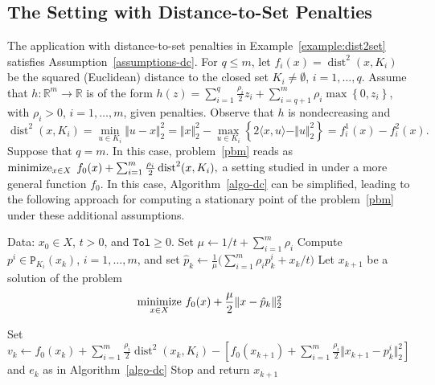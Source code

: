 \documentclass[smallextended,envcountsect]{svjour3}
\newcommand{\norm}[1]{\textstyle{\Vert} #1 \textstyle{\Vert}_2}
\newcommand{\col}[1]{\left\{#1\right\}}
\newcommand{\tol}{\texttt{Tol}}
\newcommand{\inner}[2]{\langle#1,#2\rangle}
\newcommand{\fc}[2]{: #1 \rightarrow #2}
\renewcommand{\Re}{\mathbb{R}}
\newcommand{\proj}{\mathtt{P}}
\DeclareMathOperator{\dist}{dist}
\newcommand{\nnmin}{\mathop{\rm minimize}}
\begin{document}
\subsection{The Setting with Distance-to-Set Penalties}
The application with distance-to-set penalties in Example~\ref{example:dist2set} satisfies Assumption~\ref{assumptions-dc}. For $q\leq  m$, let $f_i(x)=\dist^2(x,K_i)$ be the
 squared (Euclidean) distance to the closed  set $K_i\neq \emptyset$, $i=1,\ldots,q$. 
 Assume that 
 $h\fc{\Re^m}{\Re}$ is of the form  $h(z) = \sum_{i=1}^q\frac{\rho_i}{2} z_i +  \sum_{i=q+1}^m \rho_i\max\col{0,z_i} $, with  $\rho_i>0$, $i=1,\ldots,m$, given penalties.
Observe that $h$ is nondecreasing and
\begin{equation}\label{eq:dist2set-dc}
\dist^2(x,K_i)=\min_{u \in K_i} \norm{u-x}^2 = \norm{x}^2-\displaystyle\max_{u \in K_i} \col{2\inner{x}{u} - \norm{u}^2}=f_i^1(x)-f_i^2(x).
\end{equation}
Suppose that $q=m$. In this case, problem~\eqref{pbm} reads as
$
\nnmin_{x \in X} \; f_0 (x) + \sum_{i=1}^m \frac{\rho_i}{2} \dist^2(x,K_i),
$
a setting studied in \cite{vanAckooij_Oliveira_2025} under a more general function $f_0$. 
%
In this case, Algorithm~\ref{algo-dc} can be simplified, leading to the following approach for computing a stationary point of the problem~\eqref{pbm} under these additional assumptions.
\begin{algorithm}[htb]
\caption{Proximal Distance Algorithm - a variant of Algorithm~\ref{algo-dc}}
\label{algo-dist2set}
\begin{algorithmic}[1]
{\footnotesize
\State Data: $x_0 \in X$, $t>0$,  and $\tol\geq 0$. Set $\mu\gets 1/t+\sum_{i=1}^m\rho_i$
 \State Compute $ p^i \in \proj_{K_i}(x_k)$, $i=1,\ldots,m$, and set $\hat p_k\gets \frac{1}{\mu}\Big(\sum_{i=1}^m\rho_i p^i_{k}+x_k/t\Big)$ 
\State Let $x_{k+1}$ be a solution of the problem 
\[\nnmin_{x \in X} \,f_0(x) +\frac{\mu}{2} \norm{x-\hat p_k}^2\]

\State Set $v_k\gets f_0(x_k)+ \sum_{i=1}^m \frac{\rho_i}{2}\dist^2(x_k,K_i)  -[f_0(x_{k+1})+\sum_{i=1}^m \frac{\rho_i}{2} \norm{x_{k+1}-p^i_{k}}^2]$ and $e_k$ as in Algorithm~\ref{algo-dc}
\If{ $v_k\leq \tol$ and $e_k\leq \tol$ }
\State Stop and return $x_{k+1}$
\EndIf
\EndFor
}
  \end{algorithmic}
\end{algorithm}
\end{document}
